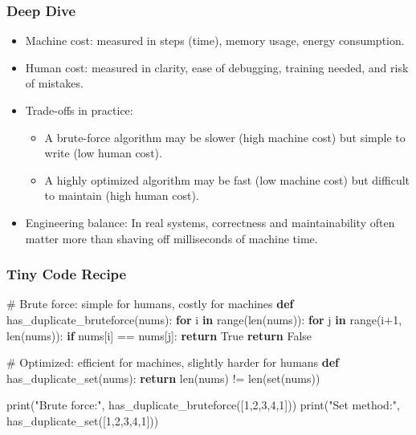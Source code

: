 \documentclass[
  letterpaper,
  DIV=11,
  numbers=noendperiod]{scrreprt}
\newenvironment{Shaded}{\begin{snugshade}}{\end{snugshade}}
\newcommand{\BuiltInTok}[1]{\textcolor[rgb]{0.00,0.23,0.31}{#1}}
\newcommand{\CommentTok}[1]{\textcolor[rgb]{0.37,0.37,0.37}{#1}}
\newcommand{\ControlFlowTok}[1]{\textcolor[rgb]{0.00,0.23,0.31}{\textbf{#1}}}
\newcommand{\DecValTok}[1]{\textcolor[rgb]{0.68,0.00,0.00}{#1}}
\newcommand{\KeywordTok}[1]{\textcolor[rgb]{0.00,0.23,0.31}{\textbf{#1}}}
\newcommand{\NormalTok}[1]{\textcolor[rgb]{0.00,0.23,0.31}{#1}}
\newcommand{\OperatorTok}[1]{\textcolor[rgb]{0.37,0.37,0.37}{#1}}
\newcommand{\StringTok}[1]{\textcolor[rgb]{0.13,0.47,0.30}{#1}}
\newcommand{\VariableTok}[1]{\textcolor[rgb]{0.07,0.07,0.07}{#1}}
\providecommand{\tightlist}{%
  \setlength{\itemsep}{0pt}\setlength{\parskip}{0pt}}
\begin{document}
\subsubsection{Deep Dive}\label{deep-dive-45}

\begin{itemize}
\item
  Machine cost: measured in steps (time), memory usage, energy
  consumption.
\item
  Human cost: measured in clarity, ease of debugging, training needed,
  and risk of mistakes.
\item
  Trade-offs in practice:

  \begin{itemize}
  \tightlist
  \item
    A brute-force algorithm may be slower (high machine cost) but simple
    to write (low human cost).
  \item
    A highly optimized algorithm may be fast (low machine cost) but
    difficult to maintain (high human cost).
  \end{itemize}
\item
  Engineering balance: In real systems, correctness and maintainability
  often matter more than shaving off milliseconds of machine time.
\end{itemize}

\subsubsection{Tiny Code Recipe}\label{tiny-code-recipe-73}

\begin{Shaded}
\begin{Highlighting}[]
\CommentTok{\# Brute force: simple for humans, costly for machines}
\KeywordTok{def}\NormalTok{ has\_duplicate\_bruteforce(nums):}
    \ControlFlowTok{for}\NormalTok{ i }\KeywordTok{in} \BuiltInTok{range}\NormalTok{(}\BuiltInTok{len}\NormalTok{(nums)):}
        \ControlFlowTok{for}\NormalTok{ j }\KeywordTok{in} \BuiltInTok{range}\NormalTok{(i}\OperatorTok{+}\DecValTok{1}\NormalTok{, }\BuiltInTok{len}\NormalTok{(nums)):}
            \ControlFlowTok{if}\NormalTok{ nums[i] }\OperatorTok{==}\NormalTok{ nums[j]:}
                \ControlFlowTok{return} \VariableTok{True}
    \ControlFlowTok{return} \VariableTok{False}

\CommentTok{\# Optimized: efficient for machines, slightly harder for humans}
\KeywordTok{def}\NormalTok{ has\_duplicate\_set(nums):}
    \ControlFlowTok{return} \BuiltInTok{len}\NormalTok{(nums) }\OperatorTok{!=} \BuiltInTok{len}\NormalTok{(}\BuiltInTok{set}\NormalTok{(nums))}

\BuiltInTok{print}\NormalTok{(}\StringTok{"Brute force:"}\NormalTok{, has\_duplicate\_bruteforce([}\DecValTok{1}\NormalTok{,}\DecValTok{2}\NormalTok{,}\DecValTok{3}\NormalTok{,}\DecValTok{4}\NormalTok{,}\DecValTok{1}\NormalTok{]))}
\BuiltInTok{print}\NormalTok{(}\StringTok{"Set method:"}\NormalTok{, has\_duplicate\_set([}\DecValTok{1}\NormalTok{,}\DecValTok{2}\NormalTok{,}\DecValTok{3}\NormalTok{,}\DecValTok{4}\NormalTok{,}\DecValTok{1}\NormalTok{]))}
\end{Highlighting}
\end{Shaded}
\end{document}
